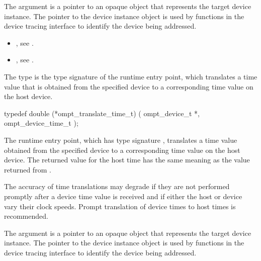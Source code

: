 \argdesc
The  argument is a pointer to an opaque object that
represents the target device instance. The pointer to the device
instance object is used by functions in the device tracing interface
to identify the device being addressed.

\crossreferences
\begin{itemize}
\item {}, see .

\item {}, see .
\end{itemize}



\label{sec:ompt_translate_time_t}

\summary
The  type is the type signature of the 
 runtime entry point, which translates a 
time value that is obtained from the specified device to a corresponding 
time value on the host device.

\format
\begin{ccppspecific}
\begin{omptInquiry}
typedef double (*ompt_translate_time_t) (
  ompt_device_t *,
  ompt_device_time_t 
);
\end{omptInquiry}
\end{ccppspecific}

\descr
The  runtime entry point, which has type signature 
, translates a time value obtained from the specified 
device to a corresponding time value on the host device. The returned value for 
the host time has the same meaning as the value returned from .

\begin{note}
The accuracy of time translations may degrade if they are not performed promptly 
after a device time value is received and if either the host or device vary their 
clock speeds. Prompt translation of device times to host times is recommended.
\end{note}

\argdesc
The  argument is a pointer to an opaque object that
represents the target device instance. The pointer to the device
instance object is used by functions in the device tracing interface
to identify the device being addressed.

